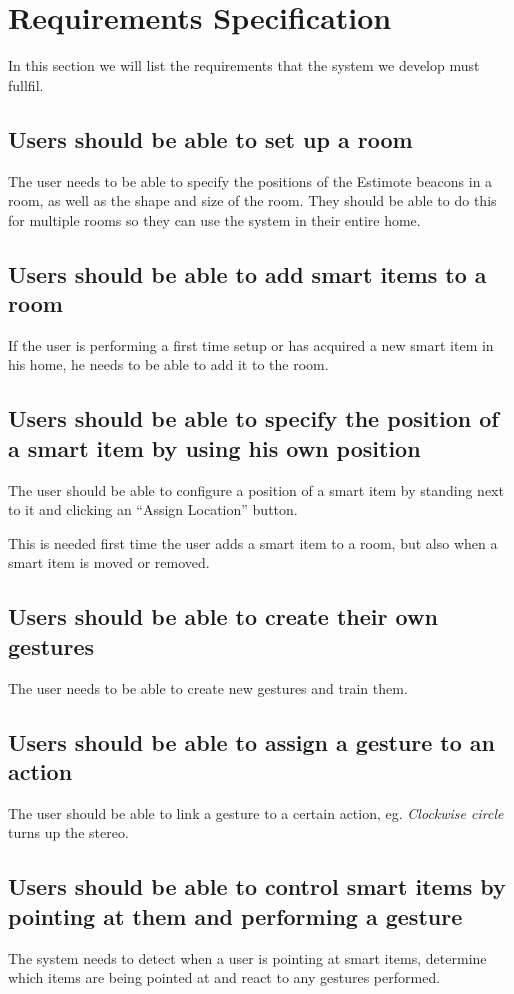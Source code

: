 \section{Requirements Specification}
\label{sec:requirements-specification}

In this section we will list the requirements that the system we develop must fullfil.

\subsection{Users should be able to set up a room}
The user needs to be able to specify the positions of the Estimote beacons in a room, as well as the shape and size of the room. They should be able to do this for multiple rooms so they can use the system in their entire home.

\subsection{Users should be able to add smart items to a room}
If the user is performing a first time setup or has acquired a new smart item in his home, he needs to be able to add it to the room.

\subsection{Users should be able to specify the position of a smart item by using his own position}
The user should be able to configure a position of a smart item by standing next to it and clicking an ``Assign Location'' button.

This is needed first time the user adds a smart item to a room, but also when a smart item is moved or removed.

\subsection{Users should be able to create their own gestures}
The user needs to be able to create new gestures and train them.

\subsection{Users should be able to assign a gesture to an action}
The user should be able to link a gesture to a certain action, eg. \textit{Clockwise circle} turns up the stereo.

\subsection{Users should be able to control smart items by pointing at them and performing a gesture}
The system needs to detect when a user is pointing at smart items, determine which items are being pointed at and react to any gestures performed.

